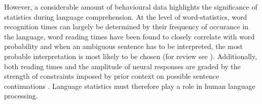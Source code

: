 \documentclass[10pt,letterpaper]{article}
\begin{document}

%
%

However, a considerable amount of behavioural data highlights the
significance of statistics during language comprehension. At the level
of word-statistics, word recognition times can largely be determined
by their frequency of occurance in the language, word reading times
have been found to closely correlate with word probability and when an
ambiguous sentence has to be interpreted, the most probable
interpretation is most likely to be chosen (for review see
\cite{Jurafsky2002}). Additionally, both reading times and the
amplitude of neural responses are graded by the strength of
constraints imposed by prior context on possible sentence
continuations \cite{GibsonPearlmutter1998}. Language statistics must
therefore play a role in human language processing. 



\end{document}
